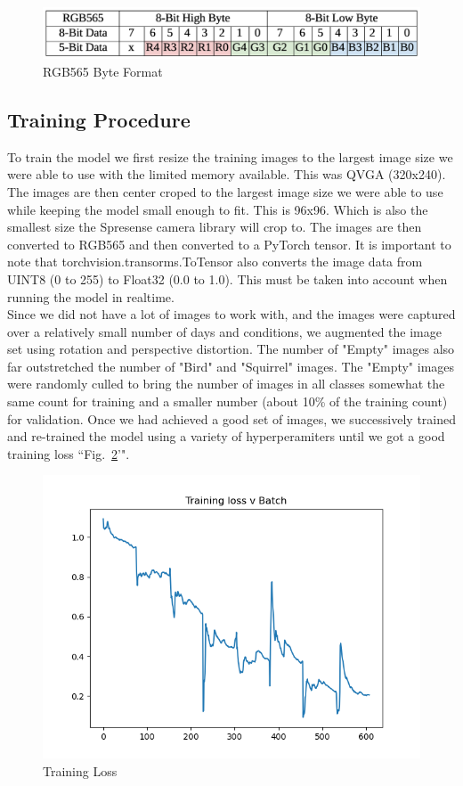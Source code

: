 \documentclass[conference]{IEEEtran}
\begin{document}
\begin{figure}[htbp]
\centerline{\includegraphics[scale=.22]{RGB565.png}}
\caption{RGB565 Byte Format}
\label{rgb565}
\end{figure}

\subsection{Training Procedure}

To train the model we first resize the training images to the largest image size we were able to use with the limited memory available. This was QVGA (320x240). The images are then center croped to the largest image size we were able to use while keeping the model small enough to fit. This is 96x96. Which is also the smallest size the Spresense camera library will crop to. The images are then converted to RGB565 and then converted to a PyTorch tensor. It is important to note that torchvision.transorms.ToTensor also converts the image data from UINT8 (0 to 255) to Float32 (0.0 to 1.0). This must be taken into account when running the model in realtime. \\
	Since we did not have a lot of images to work with, and the images were captured over a relatively small number of days and conditions, we augmented the image set using rotation and perspective distortion.  The number of "Empty" images also far outstretched the number of "Bird" and "Squirrel" images. The "Empty" images were randomly culled to bring the number of images in all classes somewhat the same count for training and a smaller number (about 10\% of the training count) for validation. Once we had achieved a good set of images, we successively trained and re-trained the model using a variety of hyperperamiters until we got a good training loss ``Fig.~\ref{tLoss}'". \\

\begin{figure}[htbp]
\centerline{\includegraphics[scale=0.5]{trainingLoss.png}}
\caption{Training Loss}
\label{tLoss}
\end{figure}
\end{document}
